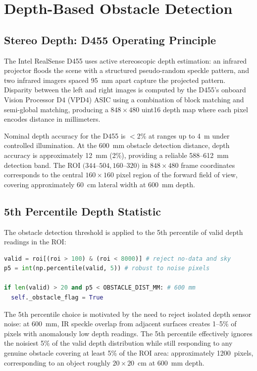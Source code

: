 \section{Depth-Based Obstacle Detection}

\subsection{Stereo Depth: D455 Operating Principle}

The Intel RealSense D455 uses active stereoscopic depth estimation: an infrared projector floods the scene with a structured pseudo-random speckle pattern, and two infrared imagers spaced 95~mm apart capture the projected pattern. Disparity between the left and right images is computed by the D455's onboard Vision Processor D4 (VPD4) ASIC using a combination of block matching and semi-global matching, producing a $848\times480$ uint16 depth map where each pixel encodes distance in millimeters.

Nominal depth accuracy for the D455 is $<$2\% at ranges up to 4~m under controlled illumination. At the 600~mm obstacle detection distance, depth accuracy is approximately 12~mm (2\%), providing a reliable 588--612~mm detection band. The ROI $(344$--$504, 160$--$320)$ in $848\times480$ frame coordinates corresponds to the central $160\times160$ pixel region of the forward field of view, covering approximately 60~cm lateral width at 600~mm depth.

\subsection{5th Percentile Depth Statistic}

The obstacle detection threshold is applied to the 5th percentile of valid depth readings in the ROI:

\begin{lstlisting}[language=Python, caption={5th-percentile obstacle detection statistic}, label={lst:percentile-obstacle}]
valid = roi[(roi > 100) & (roi < 8000)] # reject no-data and sky
p5 = int(np.percentile(valid, 5)) # robust to noise pixels

if len(valid) > 20 and p5 < OBSTACLE_DIST_MM: # 600 mm
  self._obstacle_flag = True
\end{lstlisting}

The 5th percentile choice is motivated by the need to reject isolated depth sensor noise: at 600~mm, IR speckle overlap from adjacent surfaces creates 1--5\% of pixels with anomalously low depth readings. The 5th percentile effectively ignores the noisiest 5\% of the valid depth distribution while still responding to any genuine obstacle covering at least 5\% of the ROI area: approximately 1200~pixels, corresponding to an object roughly $20\times20$~cm at 600~mm depth.

